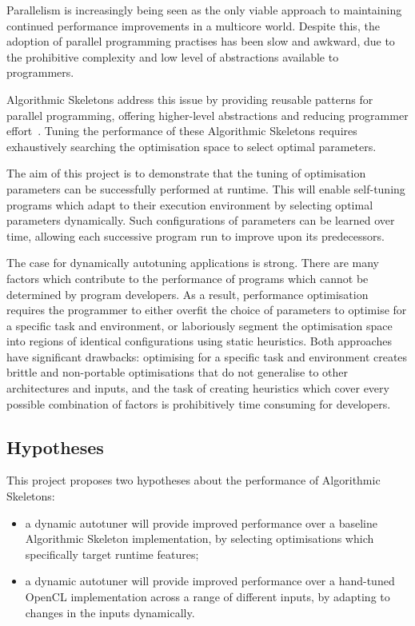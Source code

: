 Parallelism is increasingly being seen as the only viable approach to
maintaining continued performance improvements in a multicore
world. Despite this, the adoption of parallel programming practises
has been slow and awkward, due to the prohibitive complexity and low
level of abstractions available to programmers.

Algorithmic Skeletons address this issue by providing reusable
patterns for parallel programming, offering higher-level abstractions
and reducing programmer effort~\cite{Cole1989, Cole2004}. Tuning the
performance of these Algorithmic Skeletons requires exhaustively
searching the optimisation space to select optimal parameters.

The aim of this project is to demonstrate that the tuning of
optimisation parameters can be successfully performed at runtime. This
will enable self-tuning programs which adapt to their execution
environment by selecting optimal parameters dynamically. Such
configurations of parameters can be learned over time, allowing each
successive program run to improve upon its predecessors.

The case for dynamically autotuning applications is strong. There are
many factors which contribute to the performance of programs which
cannot be determined by program developers.
As a result, performance optimisation requires the programmer to
either overfit the choice of parameters to optimise for a specific
task and environment, or laboriously segment the optimisation space
into regions of identical configurations using static heuristics. Both
approaches have significant drawbacks: optimising for a specific task
and environment creates brittle and non-portable optimisations that do
not generalise to other architectures and inputs, and the task of
creating heuristics which cover every possible combination of factors
is prohibitively time consuming for developers.

\subsection{Hypotheses}
This project proposes two hypotheses about the performance of
Algorithmic Skeletons:
\begin{itemize}
\item a dynamic autotuner will provide improved performance over a
  baseline Algorithmic Skeleton implementation, by selecting
  optimisations which specifically target runtime features;
\item a dynamic autotuner will provide improved performance over a
  hand-tuned OpenCL implementation across a range of different inputs,
  by adapting to changes in the inputs dynamically.
\end{itemize}

